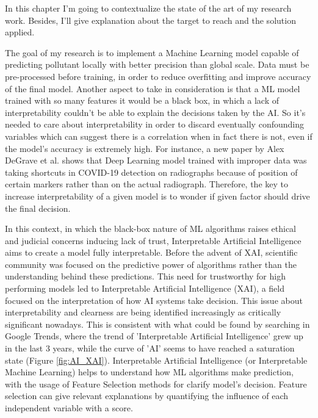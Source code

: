 In this chapter I'm going to contextualize the state of the art of my research work. 
Besides, I'll give explanation about the target to reach and the solution applied.\par
The goal of my research is to implement a Machine Learning model capable of predicting pollutant locally with better precision than global scale. 
Data must be pre-processed before training, in order to reduce overfitting and improve accuracy of the final model.\newline
Another aspect to take in consideration is that a ML model trained with so many features it would be a black box, in which a lack of interpretability couldn't be able to explain the decisions taken by the AI.
So it's needed to care about interpretability in order to discard eventually confounding variables  which can suggest there is a correlation when in fact there is not, even if the model's accuracy is extremely high. \newline
For instance, a new paper by Alex DeGrave et al.\cite{degrave2021ai} shows that Deep Learning model trained with improper data was taking shortcuts in COVID-19 detection on radiographs because of position of certain markers rather than on the actual radiograph.
Therefore, the key to increase interpretability of a given model is to wonder if given factor should drive the final decision.\par
In this context, in which the black-box nature of ML algorithms raises ethical and judicial concerns inducing lack of trust\cite{9141213}, Interpretable Artificial Intelligence aims to create a model fully interpretable.
Before the advent of XAI, scientific community was focused on the predictive power of algorithms rather than the understanding behind these predictions.
This need for trustworthy for high performing models led to  Interpretable Artificial Intelligence (XAI), a field focused on the interpretation of how AI systems take decision.
This issue about interpretability and clearness are being identified increasingly as critically significant nowadays. 
This is consistent with what could be found by searching in Google Trends, where the trend of 'Interpretable Artificial Intelligence' grew up in the last 3 years, while the curve of  'AI' seems to have reached a saturation state (Figure \ref{fig:AI_XAI}).
Interpretable Artificial Intelligence (or Interpretable Machine Learning) helps to understand how ML algorithms make prediction, with the usage of Feature Selection methods for clarify model’s decision.
Feature selection can give relevant explanations by quantifying the influence of each independent variable with a score.

